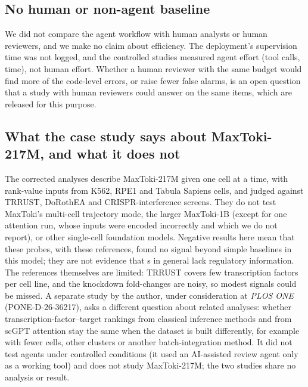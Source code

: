 \subsection*{No human or non-agent baseline}
We did not compare the agent workflow with human analysts or human
reviewers, and we make no claim about efficiency. The deployment's
supervision time was not logged, and the controlled studies measured
agent effort (tool calls, time), not human effort. Whether a human
reviewer with the same budget would find more of the code-level errors,
or raise fewer false alarms, is an open question that a study with human
reviewers could answer on the same items, which are released for this
purpose.

\subsection*{What the case study says about MaxToki-217M, and what it does not}
The corrected analyses describe MaxToki-217M given one cell at a time,
with rank-value inputs from K562, RPE1 and Tabula Sapiens cells, and
judged against TRRUST, DoRothEA and CRISPR-interference screens. They do
not test MaxToki's multi-cell trajectory mode, the larger MaxToki-1B
(except for one attention run, whose inputs were encoded incorrectly and
which we do not report), or other single-cell foundation models. Negative
results here mean that these probes, with these references, found no
signal beyond simple baselines in this model; they are not evidence that
\scfm{}s in general lack regulatory information. The references themselves
are limited: TRRUST covers few transcription factors per cell line, and
the knockdown fold-changes are noisy, so modest signals could be missed.
A separate study by the author, under consideration at \textit{PLOS ONE}
(PONE-D-26-36217), asks a different question about related analyses:
whether transcription-factor--target rankings from classical inference
methods and from scGPT attention stay the same when the dataset is built
differently, for example with fewer cells, other clusters or another
batch-integration method. It did not test agents under controlled
conditions (it used an AI-assisted review agent only as a working tool)
and does not study MaxToki-217M; the two studies share no analysis or
result.

